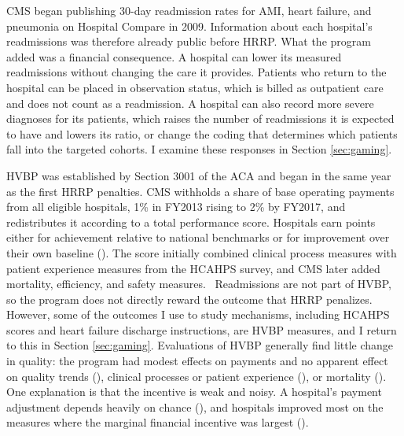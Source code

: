 \documentclass[12pt]{article}
\theoremstyle{definition}   %
\begin{document}
    CMS began publishing 30-day readmission rates for AMI, heart failure, and pneumonia on Hospital Compare in 2009. Information about each hospital's readmissions was therefore already public before HRRP. What the program added was a financial consequence. A hospital can lower its measured readmissions without changing the care it provides. Patients who return to the hospital can be placed in observation status, which is billed as outpatient care and does not count as a readmission. A hospital can also record more severe diagnoses for its patients, which raises the number of readmissions it is expected to have and lowers its ratio, or change the coding that determines which patients fall into the targeted cohorts. I examine these responses in Section \ref{sec:gaming}.

    HVBP was established by Section 3001 of the ACA and began in the same year as the first HRRP penalties. CMS withholds a share of base operating payments from all eligible hospitals, 1\% in FY2013 rising to 2\% by FY2017, and redistributes it according to a total performance score. Hospitals earn points either for achievement relative to national benchmarks or for improvement over their own baseline (\cite{CMS_2023}). The score initially combined clinical process measures with patient experience measures from the HCAHPS survey, and CMS later added mortality, efficiency, and safety measures.%
    \ Readmissions are not part of HVBP, so the program does not directly reward the outcome that HRRP penalizes. However, some of the outcomes I use to study mechanisms, including HCAHPS scores and heart failure discharge instructions, are HVBP measures, and I return to this in Section \ref{sec:gaming}. Evaluations of HVBP generally find little change in quality: the program had modest effects on payments and no apparent effect on quality trends (\cite{us2015hospital}), clinical processes or patient experience (\cite{ryan2015early}), or mortality (\cite{figueroa2016association}). One explanation is that the incentive is weak and noisy. A hospital's payment adjustment depends heavily on chance (\cite{friedson2019so}), and hospitals improved most on the measures where the marginal financial incentive was largest (\cite{norton2018moneyball}).
\end{document}

